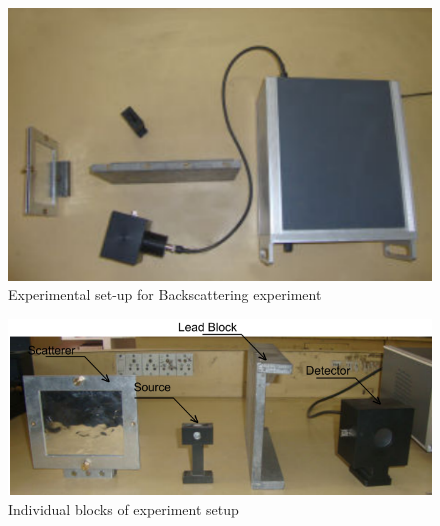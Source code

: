 \documentclass[%
 reprint,
nofootinbib,
 amsmath,amssymb,
 aps,
floatfix,
]{revtex4-2}
\begin{document}
        \begin{figure}
            \centering
            \includegraphics[scale = 0.8]{Figures/backscattTOP.png}
            \caption{Experimental set-up for Backscattering experiment}
            \label{fig:backscattTOP}
        \end{figure}
        \begin{figure}
            \centering
            \includegraphics[scale = 0.6]{Figures/backscattSIDE.png}
            \caption{Individual blocks of experiment setup}
            \label{fig:backscattSIDE}
        \end{figure}
\end{document}
